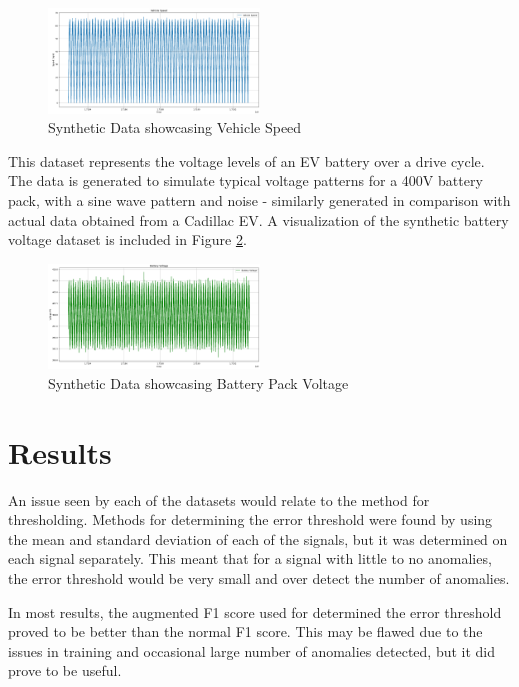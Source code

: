 \documentclass[conference]{IEEEtran}
\begin{document}
\begin{figure}[htbp]
    \centering
    \includegraphics[width=0.5\textwidth]{aj_fig_1.png}
    \caption{Synthetic Data showcasing Vehicle Speed}
    \label{aj_fig__1}
\end{figure}

This dataset represents the voltage levels of an EV battery over a drive cycle. The data is generated to simulate typical voltage patterns for a 400V battery pack, with a sine wave pattern and noise - similarly generated in comparison with actual data obtained from a Cadillac EV. A visualization of the synthetic battery voltage dataset is included in Figure \ref{aj_fig__2}.

\begin{figure}[htbp]
    \centering
    \includegraphics[width=0.5\textwidth]{aj_fig_2.png}
    \caption{Synthetic Data showcasing Battery Pack Voltage}
    \label{aj_fig__2}
\end{figure}

\section{Results}
An issue seen by each of the datasets would relate to the method for thresholding. Methods for determining the error threshold were found by using the mean and standard deviation of each of the signals, but it was determined on each signal separately. This meant that for a signal with little to no anomalies, the error threshold would be very small and over detect the number of anomalies.

In most results, the augmented F1 score used for determined the error threshold proved to be better than the normal F1 score. This may be flawed due to the issues in training and occasional large number of anomalies detected, but it did prove to be useful. 
\end{document}
